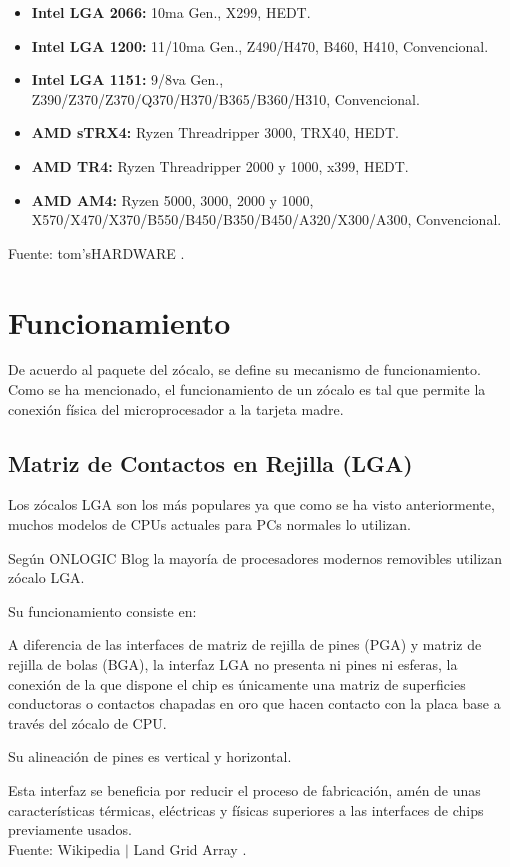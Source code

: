 \documentclass[conference]{IEEEtran}
\begin{document}
\bigbreak

\begin{itemize}
    \item \textbf{Intel LGA 2066:} 10ma Gen., X299, HEDT.
    \item \textbf{Intel LGA 1200:} 11/10ma Gen., Z490/H470, B460, H410, Convencional.
    \item \textbf{Intel LGA 1151:} 9/8va Gen., Z390/Z370/Z370/Q370/H370/B365/B360/H310, Convencional.
    \item \textbf{AMD sTRX4:} Ryzen Threadripper 3000, TRX40, HEDT.
    \item \textbf{AMD TR4:} Ryzen Threadripper 2000 y 1000, x399, HEDT.
    \item \textbf{AMD AM4:} Ryzen 5000, 3000, 2000 y 1000, X570/X470/X370/B550/B450/B350/B450/A320/X300/A300, Convencional.
\end{itemize}

\small Fuente: tom'sHARDWARE \cite{harding-2021}.

\section{Funcionamiento}

De acuerdo al paquete del zócalo, se define su mecanismo de funcionamiento. Como se ha mencionado, el funcionamiento de un zócalo es tal que permite la conexión física del microprocesador a la tarjeta madre.

\subsection{Matriz de Contactos en Rejilla (LGA)}

Los zócalos LGA son los más populares ya que como se ha visto anteriormente, muchos modelos de CPUs actuales para PCs normales lo utilizan.

\bigbreak

Según ONLOGIC Blog \cite{fanton-2021} la mayoría de procesadores modernos removibles utilizan zócalo LGA.

\bigbreak

Su funcionamiento consiste en:

\bigbreak

\begin{displayquote}
    A diferencia de las interfaces de matriz de rejilla de pines (PGA) y matriz de rejilla de bolas (BGA), la interfaz LGA no presenta ni pines ni esferas, la conexión de la que dispone el chip es únicamente una matriz de superficies conductoras o contactos chapadas en oro que hacen contacto con la placa base a través del zócalo de CPU.

    \bigbreak

    Su alineación de pines es vertical y horizontal.
    
    \bigbreak
    
    Esta interfaz se beneficia por reducir el proceso de fabricación, amén de unas características térmicas, eléctricas y físicas superiores a las interfaces de chips previamente usados.\\
    \small
    Fuente: Wikipedia $\mid$ Land Grid Array \cite{wikipedia-lga-2021D}.
\end{displayquote}
\end{document}
